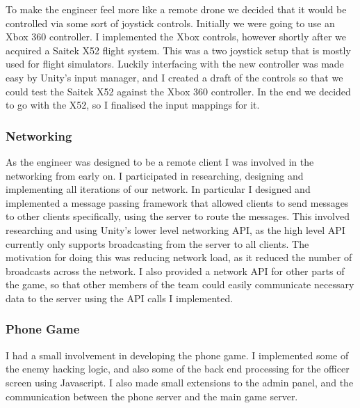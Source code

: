 \documentclass[a4paper,11pt]{article}
\begin{document}
To make the engineer feel more like a remote drone we decided that it would be controlled via some sort of joystick controls. Initially we were going to use an Xbox 360 controller. I implemented the Xbox controls, however shortly after we acquired a Saitek X52 flight system. This was a two joystick setup that is mostly used for flight simulators. Luckily interfacing with the new controller was made easy by Unity’s input manager, and I created a draft of the controls so that we could test the Saitek X52 against the Xbox 360 controller. In the end we decided to go with the X52, so I finalised the input mappings for it.

\subsubsection{Networking}

As the engineer was designed to be a remote client I was involved in the networking from early on. I participated in researching, designing and implementing all iterations of our network. In particular I designed and implemented a message passing framework that allowed clients to send messages to other clients specifically, using the server to route the messages. This involved researching and using Unity’s lower level networking API, as the high level API currently only supports broadcasting from the server to all clients. The motivation for doing this was reducing network load, as it reduced the number of broadcasts across the network. I also provided a network API for other parts of the game, so that other members of the team could easily communicate necessary data to the server using the API calls I implemented.

\subsubsection{Phone Game}

I had a small involvement in developing the phone game. I implemented some of the enemy hacking logic, and also some of the back end processing for the officer screen using Javascript. I also made small extensions to the admin panel, and the communication between the phone server and the main game server.

\clearpage
\end{document}
